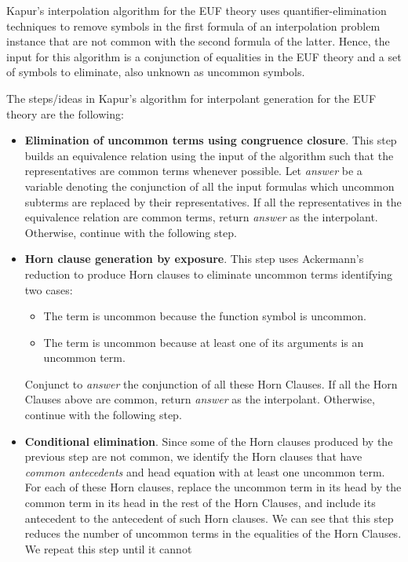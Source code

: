Kapur's interpolation algorithm for the EUF theory uses quantifier-elimination
techniques to remove symbols in the first formula of an interpolation problem instance
that are not common with the second formula of the latter. 
Hence, the input for this algorithm is a conjunction of equalities in the
EUF theory and a set of symbols to eliminate, also unknown as uncommon symbols.

The steps/ideas in Kapur's algorithm for interpolant generation for the EUF theory
are the following:

\begin{itemize}
\item \textbf{Elimination of uncommon terms using congruence closure}.
  This step builds an equivalence
  relation using the input of the algorithm such that the representatives are common terms
  whenever possible. Let \emph{answer} be a variable denoting the 
  conjunction of all the input formulas
  which uncommon subterms are replaced by their representatives.
  If all the representatives in the equivalence relation are common terms, return \emph{answer}
  as the interpolant. Otherwise, continue with the following step.
\item \textbf{Horn clause generation by exposure}. This step uses Ackermann's 
  reduction \cite{10.5555/1391237}
  to produce Horn clauses to eliminate uncommon terms identifying two cases:
  \begin{itemize}
  \item The term is uncommon because the function symbol is uncommon.
  \item The term is uncommon because at least one of its arguments is
    an uncommon term.
  \end{itemize}
  Conjunct to \emph{answer} the conjunction of all these Horn Clauses.
  If all the Horn Clauses above are common, return \emph{answer} as the interpolant.
  Otherwise, continue with the following step.
\item \textbf{Conditional elimination}. Since some of the Horn clauses produced by
  the previous step are not common, we identify the Horn clauses that have
  \emph{common antecedents} and head equation with at least one uncommon term. For each
  of these Horn clauses, replace the uncommon term in its head by the common term in its head
  in the rest of the Horn Clauses, and include its antecedent 
  to the antecedent of such Horn clauses.
  We can see that this step reduces the number of uncommon 
  terms in the equalities of
  the Horn Clauses. We repeat this step until it cannot 

\end{itemize}
